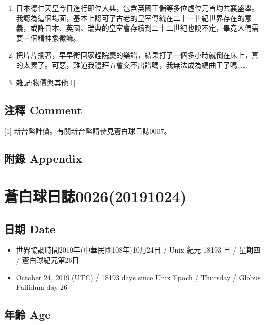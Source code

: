 \documentclass[a5paper, 12pt
]{book}
\providecommand{\tightlist}{%
  \setlength{\itemsep}{0pt}\setlength{\parskip}{0pt}}
\begin{document}
\begin{enumerate}
\def\labelenumi{\arabic{enumi}.}
\item
  日本德仁天皇今日進行即位大典，包含英國王儲等多位虛位元首均共襄盛舉。我認為這個場面，基本上認可了古老的皇室傳統在二十一世紀世界存在的意義，或許日本、英國、瑞典的皇室會存續到二十二世紀也說不定，畢竟人們需要一個精神象徵嘛。
\item
  把片片擱著，早早衝回家趕院慶的樂譜，結果打了一個多小時就倒在床上，真的太累了。可惡，難道我禮拜五會交不出譜嗎，我無法成為編曲王了嗎\ldots\ldots{}
\item
  雜記:物價與其他{[}1{]}
\end{enumerate}

\hypertarget{ux6ce8ux91cb-comment-18}{%
\subsection{注釋 Comment}\label{ux6ce8ux91cb-comment-18}}

{[}1{]} 新台幣計價。有關新台幣請參見蒼白球日誌0007。

\hypertarget{ux9644ux9304-appendix-17}{%
\subsection{附錄 Appendix}\label{ux9644ux9304-appendix-17}}

\hypertarget{ux84bcux767dux7403ux65e5ux8a8c002620191024}{%
\section{蒼白球日誌0026(20191024)}\label{ux84bcux767dux7403ux65e5ux8a8c002620191024}}

\hypertarget{ux65e5ux671f-date-23}{%
\subsection{日期 Date}\label{ux65e5ux671f-date-23}}

\begin{itemize}
\tightlist
\item
  世界協調時間2019年(中華民國108年)10月24日 / Unix 紀元 18193 日 /
  星期四 / 蒼白球紀元第26日
\item
  October 24, 2019 (UTC) / 18193 days since Unix Epoch / Thursday /
  Globus Pallidum day 26
\end{itemize}

\hypertarget{ux5e74ux9f61-age-23}{%
\subsection{年齡 Age}\label{ux5e74ux9f61-age-23}}
\end{document}
